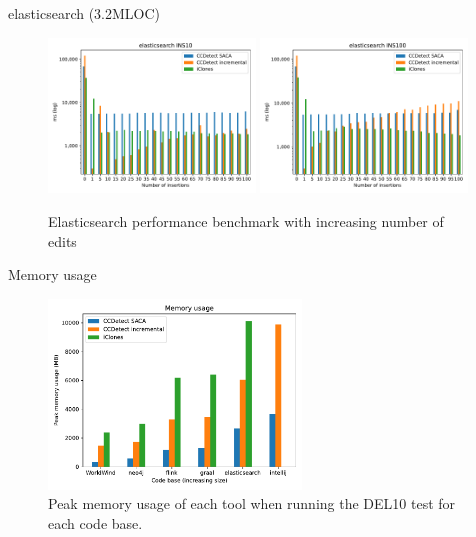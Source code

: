 \documentclass[aspectratio=1610, xcolor=table]{beamer}
\begin{document}
\begin{frame}{elasticsearch (3.2MLOC)}
    \begin{figure}[H]
    \begin{center}
        \includegraphics[width=0.49\textwidth]{figures/incedit_performancegraphs/elasticsearch_INS10.pdf}
        \includegraphics[width=0.49\textwidth]{figures/incedit_performancegraphs/elasticsearch_INS100.pdf}
    \end{center}
    \caption{Elasticsearch performance benchmark with increasing number of edits}
    \label{fig:elasticsearch_inc}
    \end{figure}
\end{frame}

\begin{frame}{Memory usage}
    \begin{figure}[H]
    \begin{center}
        \includegraphics[width=0.6\textwidth]{figures/memoryusage.pdf}
    \end{center}
    \caption{Peak memory usage of each tool when running the DEL10 test for each code base.}
    \label{fig:memoryusage}
\end{figure}
\end{frame}
\end{document}
